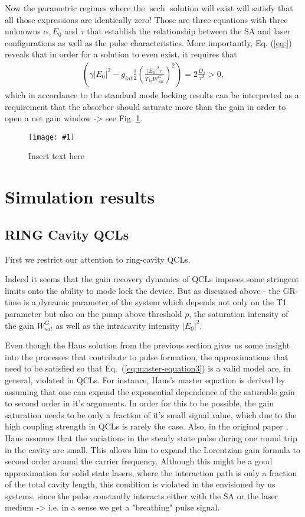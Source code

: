 \documentclass[preprint,secnumarabic,amssymb, nobibnotes, aip, prd]{revtex4-1}
\DeclareMathOperator{\sech}{sech}
\newcommand{\includegraphicsM}[1]{\texttt{[image: \#1]}}
\begin{document}
Now the parametric regimes where the $\sech$ solution will exist will satisfy that all those expressions are identically zero! Those are three equations with three unknowns $\alpha, E_0 $ and $\tau$ that establish the relationship between the SA and laser configurations as well as the pulse characteristics. More importantly, Eq. (\ref{eq:}) reveals that in order for a solution to even exist, it requires that 
\begin{align}
\left (\gamma|E_0|^2 -g_{int}\frac{1}{2}\left(\frac{|E_0|^2\tau}{T_{1g}W_{sat}^G}\right)^2\right)=2\frac{D_f}{\tau^2}>0, 
\end{align}
which in accordance to the standard mode locking results \cite{haus1975theoryslow} can be interpreted as a requirement that the absorber should saturate more than the gain in order to open a net gain window -> see Fig. \ref{fig:SCHEMA}. 
\begin{figure}[H]
	\centering
	\includegraphicsM{IMGS/SCHEMA}
	\caption{Insert text here}
	\label{fig:SCHEMA}
\end{figure}

\section{Simulation results}
\subsection{RING Cavity QCLs}

First we restrict our attention to ring-cavity QCLs.

Indeed it seems that the gain recovery dynamics of QCLs imposes some stringent limits onto the ability to mode lock the device. But as discussed above - the GR-time is a dynamic parameter of the system which depends not only on the T1 parameter but also on the pump above threshold $p$, the saturation intensity of the gain $W_{sat}^G$ as well as the intracavity intensity $|E_0|^2$. 

Even though the Haus solution from the previous section gives us some insight into the processes that contribute to pulse formation, the approximations that need to be satisfied so that Eq.~(\ref{eq:master-equation3}) is a valid model are, in general, violated in QCLs. For instance, Haus's master equation is derived by assuming that one can expand the exponential dependence of the saturable gain to second order in it's arguments. 
In order for this to be possible, the gain saturation needs to be only a fraction of it's small signal value, which due to the high coupling strength in QCLs is rarely the case. Also, in the original paper \cite{haus1975theory,haus1975theoryslow}, Haus assumes that the variations in the steady state pulse during one round trip in the cavity are small. This allows him to expand the Lorentzian gain formula to second order around the carrier frequency. Although this might be a good approximation for solid state lasers, where the interaction path is only a fraction of the total cavity length, this condition is violated in the envisioned by us systems, since the pulse constantly interacts either with the SA or the laser medium -> i.e. in a sense we get a "breathing" pulse signal. 
\end{document}
